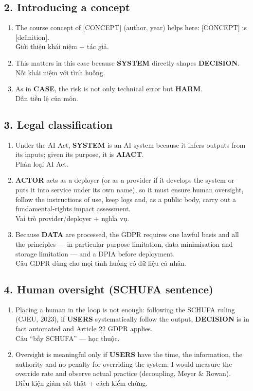 \documentclass[11pt,a4paper]{article}
\newcommand{\vitext}[1]{{\small\color{tipc}#1}}
\newcommand{\slot}[1]{{\setlength{\fboxsep}{1.2pt}\colorbox{slotbg}{\sffamily\scriptsize\bfseries\color{RoyalBlue}#1}}}
\begin{document}
\subsection*{2. Introducing a concept}\begin{enumerate}[leftmargin=1.6em]
\item The course concept of [CONCEPT] (author, year) helps here: [CONCEPT] is [definition].\\\vitext{Giới thiệu khái niệm + tác giả.}
\item This matters in this case because \slot{SYSTEM} directly shapes \slot{DECISION}.\\\vitext{Nối khái niệm với tình huống.}
\item As in \slot{CASE}, the risk is not only technical error but \slot{HARM}.\\\vitext{Dẫn tiền lệ của môn.}
\end{enumerate}
\subsection*{3. Legal classification}\begin{enumerate}[leftmargin=1.6em]
\item Under the AI Act, \slot{SYSTEM} is an AI system because it infers outputs from its inputs; given its purpose, it is \slot{AIACT}.\\\vitext{Phân loại AI Act.}
\item \slot{ACTOR} acts as a deployer (or as a provider if it develops the system or puts it into service under its own name), so it must ensure human oversight, follow the instructions of use, keep logs and, as a public body, carry out a fundamental-rights impact assessment.\\\vitext{Vai trò provider/deployer + nghĩa vụ.}
\item Because \slot{DATA} are processed, the GDPR requires one lawful basis and all the principles — in particular purpose limitation, data minimisation and storage limitation — and a DPIA before deployment.\\\vitext{Câu GDPR dùng cho mọi tình huống có dữ liệu cá nhân.}
\end{enumerate}
\subsection*{4. Human oversight (SCHUFA sentence)}\begin{enumerate}[leftmargin=1.6em]
\item Placing a human in the loop is not enough: following the SCHUFA ruling (CJEU, 2023), if \slot{USERS} systematically follow the output, \slot{DECISION} is in fact automated and Article 22 GDPR applies.\\\vitext{Câu “bẫy SCHUFA” — học thuộc.}
\item Oversight is meaningful only if \slot{USERS} have the time, the information, the authority and no penalty for overriding the system; I would measure the override rate and observe actual practice (decoupling, Meyer \& Rowan).\\\vitext{Điều kiện giám sát thật + cách kiểm chứng.}
\end{enumerate}
\end{document}
